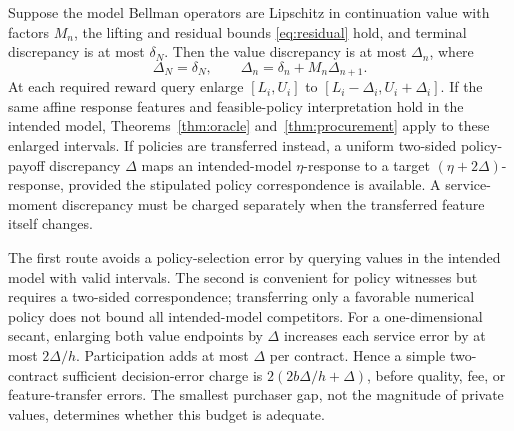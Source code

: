 \begin{theorem}
\label{thm:transfer}
Suppose the model Bellman operators are Lipschitz in continuation value with factors $M_n$, the lifting and residual bounds \eqref{eq:residual} hold, and terminal discrepancy is at most $\delta_N$. Then the value discrepancy is at most $\Delta_n$, where
\begin{equation}
 \Delta_N=\delta_N,\qquad \Delta_n=\delta_n+M_n\Delta_{n+1}.
 \label{eq:transferrecursion}
\end{equation}
At each required reward query enlarge $[L_i,U_i]$ to $[L_i-\Delta_i,U_i+\Delta_i]$. If the same affine response features and feasible-policy interpretation hold in the intended model, Theorems~\ref{thm:oracle} and~\ref{thm:procurement} apply to these enlarged intervals. If policies are transferred instead, a uniform two-sided policy-payoff discrepancy $\Delta$ maps an intended-model $\eta$-response to a target $(\eta+2\Delta)$-response, provided the stipulated policy correspondence is available. A service-moment discrepancy must be charged separately when the transferred feature itself changes.
\end{theorem}

The first route avoids a policy-selection error by querying values in the intended model with valid intervals. The second is convenient for policy witnesses but requires a two-sided correspondence; transferring only a favorable numerical policy does not bound all intended-model competitors. For a one-dimensional secant, enlarging both value endpoints by $\Delta$ increases each service error by at most $2\Delta/h$. Participation adds at most $\Delta$ per contract. Hence a simple two-contract sufficient decision-error charge is $2(2b\Delta/h+\Delta)$, before quality, fee, or feature-transfer errors. The smallest purchaser gap, not the magnitude of private values, determines whether this budget is adequate.

